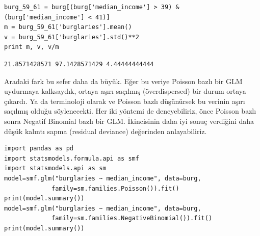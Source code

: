 \documentclass[12pt,fleqn]{article}\usepackage{../../common}
\begin{document}
\begin{verbatim}
burg_59_61 = burg[(burg['median_income'] > 39) & (burg['median_income'] < 41)]
m = burg_59_61['burglaries'].mean()
v = burg_59_61['burglaries'].std()**2
print m, v, v/m
\end{verbatim}

\begin{verbatim}
21.8571428571 97.1428571429 4.44444444444
\end{verbatim}

Aradaki fark bu sefer daha da büyük. Eğer bu veriye Poisson bazlı bir GLM
uydurmaya kalksaydık, ortaya aşırı saçılmış (överdispersed) bir durum
ortaya çıkardı. Ya da terminoloji olarak ve Poisson bazlı düşünürsek bu
verinin aşırı saçılmış olduğu söylenecekti. Her iki yöntemi de
deneyebiliriz, önce Poisson bazlı sonra Negatif Binomial bazlı bir
GLM. İkincisinin daha iyi sonuç verdiğini daha düşük kalıntı sapma
(residual deviance) değerinden anlayabiliriz.

\begin{verbatim}
import pandas as pd
import statsmodels.formula.api as smf
import statsmodels.api as sm
model=smf.glm("burglaries ~ median_income", data=burg,
             family=sm.families.Poisson()).fit()
print(model.summary())
model=smf.glm("burglaries ~ median_income", data=burg,
             family=sm.families.NegativeBinomial()).fit()
print(model.summary())
\end{verbatim}
\end{document}
